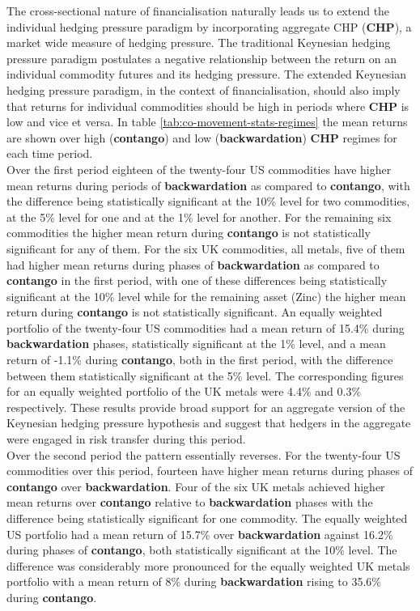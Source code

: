 \documentclass[]{elsarticle} %
\begin{document}
\medskip\setlength{\parindent}{0pt}

The cross-sectional nature of financialisation naturally leads us to extend the individual hedging pressure paradigm by incorporating aggregate CHP (\textbf{CHP}), a market wide measure of hedging pressure. The traditional Keynesian hedging pressure paradigm postulates a negative relationship between the return on an individual commodity futures and its hedging pressure. The extended Keynesian hedging pressure paradigm, in the context of financialisation, should also imply that returns for individual commodities should be high in periods where \textbf{CHP} is low and vice et versa. In table \ref{tab:co-movement-stats-regimes} the mean returns are shown over high (\textbf{contango}) and low (\textbf{backwardation}) \textbf{CHP} regimes for each time period.\\
Over the first period eighteen of the twenty-four US commodities have higher mean returns during periods of \textbf{backwardation} as compared to \textbf{contango}, with the difference being statistically significant at the 10\% level for two commodities, at the 5\% level for one and at the 1\% level for another. For the remaining six commodities the higher mean return during \textbf{contango} is not statistically significant for any of them. For the six UK commodities, all metals, five of them had higher mean returns during phases of \textbf{backwardation} as compared to \textbf{contango} in the first period, with one of these differences being statistically significant at the 10\% level while for the remaining asset (Zinc) the higher mean return during \textbf{contango} is not statistically significant. An equally weighted portfolio of the twenty-four US commodities had a mean return of 15.4\% during \textbf{backwardation} phases, statistically significant at the 1\% level, and a mean return of -1.1\% during \textbf{contango}, both in the first period, with the difference between them statistically significant at the 5\% level. The corresponding figures for an equally weighted portfolio of the UK metals were 4.4\% and 0.3\% respectively. These results provide broad support for an aggregate version of the Keynesian hedging pressure hypothesis and suggest that hedgers in the aggregate were engaged in risk transfer during this period.\\
Over the second period the pattern essentially reverses. For the twenty-four US commodities over this period, fourteen have higher mean returns during phases of \textbf{contango} over \textbf{backwardation}. Four of the six UK metals achieved higher mean returns over \textbf{contango} relative to \textbf{backwardation} phases with the difference being statistically significant for one commodity. The equally weighted US portfolio had a mean return of 15.7\% over \textbf{backwardation} against 16.2\% during phases of \textbf{contango}, both statistically significant at the 10\% level. The difference was considerably more pronounced for the equally weighted UK metals portfolio with a mean return of 8\% during \textbf{backwardation} rising to 35.6\% during \textbf{contango}.
\end{document}
